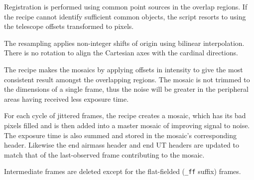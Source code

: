 \documentclass[twoside,11pt,nolof]{starlink}
\begin{document}
{{{         \sstitem
         Registration is performed using common point sources in the
         overlap regions.  If the recipe cannot identify sufficient common
         objects, the script resorts to using the telescope offsets
         transformed to pixels.

         \sstitem
         The resampling applies non-integer shifts of origin using
         bilinear interpolation.  There is no rotation to align the
         Cartesian axes with the cardinal directions.

         \sstitem
         The recipe makes the mosaics by applying offsets in intensity
         to give the most consistent result amongst the overlapping regions.
         The mosaic is not trimmed to the dimensions of a single frame, thus
         the noise will be greater in the peripheral areas having received
         less exposure time.

         \sstitem
         For each cycle of jittered frames, the recipe creates a mosaic,
         which has its bad pixels filled and is then added into a master
         mosaic of improving signal to noise.  The exposure time is
	 also summed and stored in the mosaic's corresponding header.
	 Likewise the end airmass header and end UT headers are
	 updated to match that of the last-observed frame contributing
	 to the mosaic.

         \sstitem
         Intermediate frames are deleted except for the flat-fielded ({\tt\_ff}
         suffix) frames.
      }
   }
   }
\end{document}
